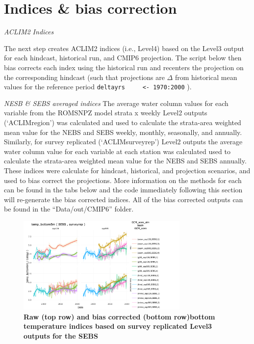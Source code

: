 \documentclass[
]{article}
\begin{document}
\hypertarget{indices-bias-correction}{%
\section{Indices \& bias correction}\label{indices-bias-correction}}

\emph{ACLIM2 Indices}

The next step creates ACLIM2 indices (i.e., Level4) based on the Level3
output for each hindcast, historical run, and CMIP6 projection. The
script below then bias corrects each index using the historical run and
recenters the projection on the corresponding hindcast (such that
projections are \(\Delta\) from historical mean values for the reference
period \texttt{deltayrs\ \ \ \ \ \textless{}-\ 1970:2000} ).

\emph{NESB \& SEBS averaged indices} The average water column values for
each variable from the ROMSNPZ model strata x weekly Level2 outputs
(`ACLIMregion') was calculated and used to calculate the strata-area
weighted mean value for the NEBS and SEBS weekly, monthly, seasonally,
and annually. Similarly, for survey replicated (`ACLIMsurveyrep') Level2
outputs the average water column value for each variable at each station
was calculated used to calculate the strata-area weighted mean value for
the NEBS and SEBS annually. These indices were calculate for hindcast,
historical, and projection scenarios, and used to bias correct the
projections. More information on the methods for each can be found in
the tabs below and the code immediately following this section will
re-generate the bias corrected indices. All of the bias corrected
outputs can be found in the ``Data/out/CMIP6'' folder.

\begin{figure}
\centering
\includegraphics[width=0.75\textwidth,height=\textheight]{Figs/biascorrected_temp2.png}
\caption{\textbf{Raw (top row) and bias corrected (bottom row)bottom
temperature indices based on survey replicated Level3 outputs for the
SEBS}}
\end{figure}
\end{document}
